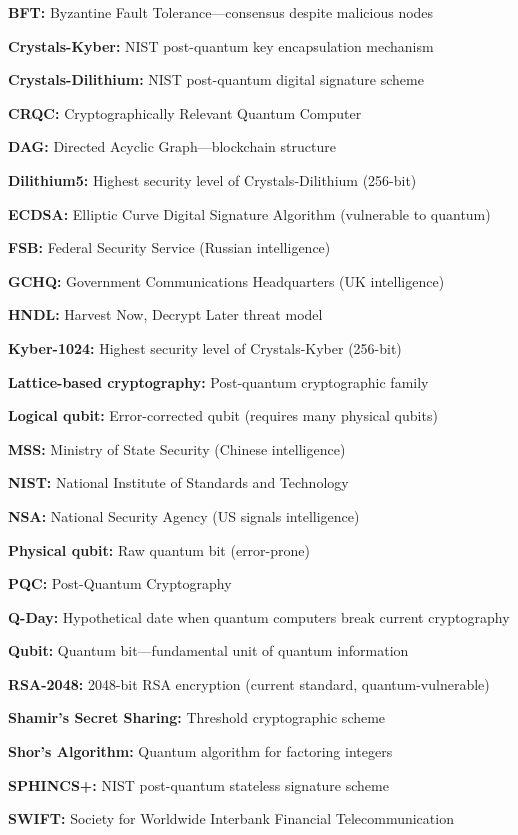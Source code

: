 \documentclass[12pt,oneside]{book}
\begin{document}
\textbf{BFT:} Byzantine Fault Tolerance---consensus despite malicious nodes

\textbf{Crystals-Kyber:} NIST post-quantum key encapsulation mechanism

\textbf{Crystals-Dilithium:} NIST post-quantum digital signature scheme

\textbf{CRQC:} Cryptographically Relevant Quantum Computer

\textbf{DAG:} Directed Acyclic Graph---blockchain structure

\textbf{Dilithium5:} Highest security level of Crystals-Dilithium (256-bit)

\textbf{ECDSA:} Elliptic Curve Digital Signature Algorithm (vulnerable to quantum)

\textbf{FSB:} Federal Security Service (Russian intelligence)

\textbf{GCHQ:} Government Communications Headquarters (UK intelligence)

\textbf{HNDL:} Harvest Now, Decrypt Later threat model

\textbf{Kyber-1024:} Highest security level of Crystals-Kyber (256-bit)

\textbf{Lattice-based cryptography:} Post-quantum cryptographic family

\textbf{Logical qubit:} Error-corrected qubit (requires many physical qubits)

\textbf{MSS:} Ministry of State Security (Chinese intelligence)

\textbf{NIST:} National Institute of Standards and Technology

\textbf{NSA:} National Security Agency (US signals intelligence)

\textbf{Physical qubit:} Raw quantum bit (error-prone)

\textbf{PQC:} Post-Quantum Cryptography

\textbf{Q-Day:} Hypothetical date when quantum computers break current cryptography

\textbf{Qubit:} Quantum bit---fundamental unit of quantum information

\textbf{RSA-2048:} 2048-bit RSA encryption (current standard, quantum-vulnerable)

\textbf{Shamir's Secret Sharing:} Threshold cryptographic scheme

\textbf{Shor's Algorithm:} Quantum algorithm for factoring integers

\textbf{SPHINCS+:} NIST post-quantum stateless signature scheme

\textbf{SWIFT:} Society for Worldwide Interbank Financial Telecommunication
\end{document}
